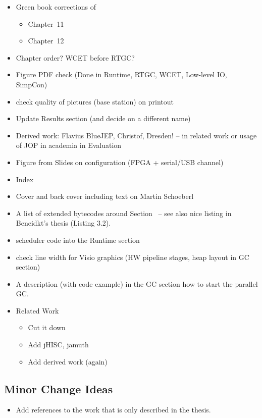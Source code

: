 \begin{itemize}
  \item Green book corrections of
  \begin{itemize}
    \item Chapter~11
    \item Chapter~12
  \end{itemize}
  \item Chapter order? WCET before RTGC?
    \item Figure PDF check (Done in Runtime, RTGC, WCET,
        Low-level IO, SimpCon)
    \item check quality of pictures (base station) on printout
    \item Update Results section (and decide on a different name)
    \item Derived work: Flavius BlueJEP, Christof, Dresden! -- in
        related work or usage of JOP in academia in Evaluation
    \item Figure from Slides on configuration (FPGA + serial/USB
    channel)
    \item Index
    \item Cover and back cover including text on Martin Schoeberl
    \item A list of extended bytecodes around
        Section~\label{subsec:flex:bc} -- see also nice listing
        in Beneidkt's thesis (Listing 3.2).
    \item scheduler code into the Runtime section
    \item check line width for Visio graphics (HW pipeline
        stages, heap layout in GC section)
    \item A description (with code example) in the GC section how
        to start the parallel GC.
    \item Related Work
    \begin{itemize}
        \item Cut it down
        \item Add jHISC, jamuth
        \item Add derived work (again)
    \end{itemize}
\end{itemize}

\subsection{Minor Change Ideas}

\begin{itemize}
  \item Add references to the work that is only described in the
      thesis.
\end{itemize}

